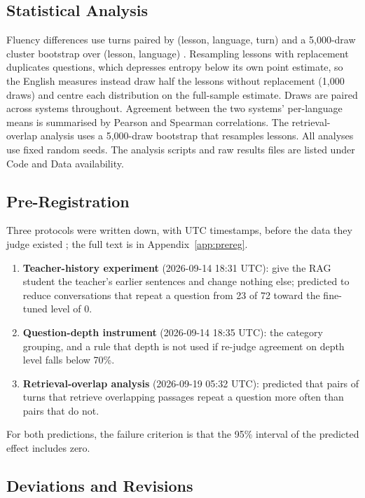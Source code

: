 \documentclass[pdflatex,sn-mathphys-num]{sn-jnl}%
\theoremstyle{thmstyleone}%
\theoremstyle{thmstyletwo}%
\theoremstyle{thmstylethree}%
\begin{document}
\subsection{Statistical Analysis}\label{sec:stats}

Fluency differences use turns paired by (lesson, language, turn) and a 5,000-draw cluster bootstrap
over (lesson, language) \cite{efron1993}. Resampling lessons with replacement duplicates questions,
which depresses entropy below its own point estimate, so the English measures instead draw half the
lessons without replacement (1,000 draws) and centre each distribution on the full-sample estimate.
Draws are paired across systems throughout. Agreement between the two systems' per-language means is
summarised by Pearson and Spearman correlations. The retrieval-overlap analysis uses a 5,000-draw
bootstrap that resamples lessons. All analyses use fixed random seeds. The analysis scripts and raw
results files are listed under Code and Data availability.

\subsection{Pre-Registration}\label{sec:prereg}

Three protocols were written down, with UTC timestamps, before the data they judge existed
\cite{nosek2018}; the full text is in Appendix~\ref{app:prereg}.

\begin{enumerate}
\item \textbf{Teacher-history experiment} (2026-09-14 18:31 UTC): give the RAG student the teacher's
earlier sentences and change nothing else; predicted to reduce conversations that repeat a question
from 23 of 72 toward the fine-tuned level of 0.
\item \textbf{Question-depth instrument} (2026-09-14 18:35 UTC): the category grouping, and a rule that
depth is not used if re-judge agreement on depth level falls below 70\%.
\item \textbf{Retrieval-overlap analysis} (2026-09-19 05:32 UTC): predicted that pairs of turns that
retrieve overlapping passages repeat a question more often than pairs that do not.
\end{enumerate}

For both predictions, the failure criterion is that the 95\% interval of the predicted effect
includes zero.

\subsection{Deviations and Revisions}\label{sec:deviations}
\end{document}
